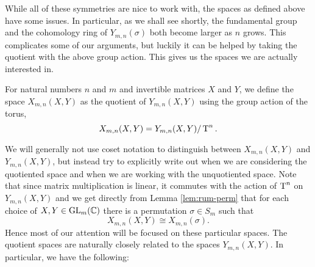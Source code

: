 While all of these symmetries are nice
to work with, the spaces as defined above have some issues. In
particular, as we shall see shortly, the
fundamental group and the cohomology ring of
$Y_{m,n}(\sigma)$ both become larger as $n$ grows. This complicates
some of our arguments, but luckily it can be helped by taking the
quotient with the above group action. This gives us the spaces we are
actually interested in.

\begin{definition}
  \label{def:kvotientrum}
  For natural numbers $n$ and $m$ and invertible matrices $X$ and $Y$,
  we define the space $X_{m,n}(X,Y)$ as the quotient of $Y_{m,n}(X,Y)$
  using the group action of the torus,
  \[ X_{m,n}(X,Y) = Y_{m,n}(X,Y) / \operatorname{T}^n. \]
\end{definition}

We will generally not use coset notation to distinguish between
$X_{m,n}(X,Y)$ and $Y_{m,n}(X,Y)$, but instead try to explicitly write
out when we are considering the quotiented space and when we are
working with the unquotiented space.
Note that since matrix multiplication is linear, it commutes with the
action of $\operatorname{T}^n$ on $Y_{m,n}(X,Y)$ and we get directly from Lemma
\ref{lem:rum-perm} that for each choice of ${X,Y\in \operatorname{GL}_m(\mathbb{C})}$ there
is a permutation $\sigma \in S_m$ such that
\[ X_{m,n}(X,Y) \cong X_{m,n}(\sigma). \]
Hence most of our attention will be focused on these particular
spaces. The quotient spaces are naturally closely related to the
spaces $Y_{m,n}(X,Y)$. In particular, we have the following:

